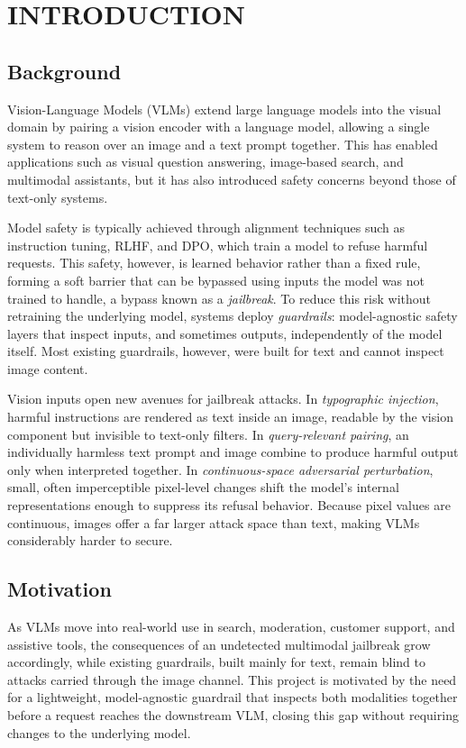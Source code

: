 \chapter{INTRODUCTION}

\section{Background}
Vision-Language Models (VLMs) extend large language models into the visual
domain by pairing a vision encoder with a language model, allowing a single
system to reason over an image and a text prompt together. This has enabled
applications such as visual question answering, image-based search, and
multimodal assistants, but it has also introduced safety concerns beyond
those of text-only systems.

Model safety is typically achieved through alignment techniques such as
instruction tuning, RLHF, and DPO, which train a model to refuse harmful
requests. This safety, however, is learned behavior rather than a fixed
rule, forming a soft barrier that can be bypassed using inputs the model was
not trained to handle, a bypass known as a \textit{jailbreak}. To reduce this
risk without retraining the underlying model, systems deploy
\textit{guardrails}: model-agnostic safety layers that inspect inputs, and
sometimes outputs, independently of the model itself. Most existing
guardrails, however, were built for text and cannot inspect image content.

Vision inputs open new avenues for jailbreak attacks. In
\textit{typographic injection}, harmful instructions are rendered as text
inside an image, readable by the vision component but invisible to
text-only filters. In \textit{query-relevant pairing}, an individually
harmless text prompt and image combine to produce harmful output only when
interpreted together. In \textit{continuous-space adversarial
perturbation}, small, often imperceptible pixel-level changes shift the
model's internal representations enough to suppress its refusal behavior.
Because pixel values are continuous, images offer a far larger attack space
than text, making VLMs considerably harder to secure.

\section{Motivation}
As VLMs move into real-world use in search, moderation, customer support,
and assistive tools, the consequences of an undetected multimodal jailbreak
grow accordingly, while existing guardrails, built mainly for text, remain
blind to attacks carried through the image channel. This project is
motivated by the need for a lightweight, model-agnostic guardrail that
inspects both modalities together before a request reaches the downstream
VLM, closing this gap without requiring changes to the underlying model.

